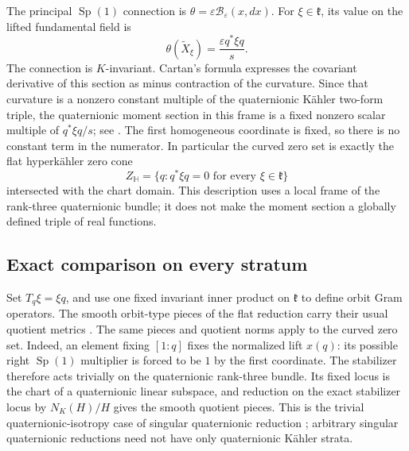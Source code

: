 \documentclass[11pt]{amsart}
\theoremstyle{definition}
\theoremstyle{remark}
\newcommand{\Hh}{\mathbb H}
\newcommand{\kk}{\mathfrak k}
\newcommand{\Sp}{\operatorname{Sp}}
\begin{document}
The principal $\Sp(1)$ connection is
$\theta=\varepsilon\mathcal B_\varepsilon(x,dx)$.
For $\xi\in\kk$, its value on the lifted fundamental field is
\[
 \theta(\widetilde X_\xi)=\frac{\varepsilon q^*\xi q}{s}.
\]
The connection is $K$-invariant. Cartan's formula expresses the
covariant derivative of this section as minus contraction of the
curvature. Since that curvature is a nonzero constant multiple of
the quaternionic Kähler two-form triple, the quaternionic moment
section in this frame is a fixed nonzero scalar multiple of
$q^*\xi q/s$; see \cite[Chapter 3, \S3.2]{Swa90}.
The first homogeneous coordinate is fixed, so there is no constant
term in the numerator. In particular the curved zero set is exactly
the flat hyperkähler zero cone
\begin{equation}\label{eq:qkzero}
 Z_\Hh=\{q:q^*\xi q=0\text{ for every }\xi\in\kk\}
\end{equation}
intersected with the chart domain. This description uses a local
frame of the rank-three quaternionic bundle; it does not make the
moment section a globally defined triple of real functions.

\subsection{Exact comparison on every stratum}
Set $T_q\xi=\xi q$, and use one fixed invariant inner product on
$\kk$ to define orbit Gram operators. The smooth orbit-type pieces
of the flat reduction carry their usual quotient metrics
\cite[Theorem 1.1 and \S2.5]{May22}. The same pieces and quotient
norms apply to the curved zero set. Indeed, an element fixing
$[1:q]$ fixes the normalized lift $x(q)$: its possible right
$\Sp(1)$ multiplier is forced to be $1$ by the first coordinate.
The stabilizer therefore acts trivially on the quaternionic
rank-three bundle. Its fixed locus is the chart of a quaternionic
linear subspace, and reduction on the exact stabilizer locus by
$N_K(H)/H$ gives the smooth quotient pieces. This is the trivial
quaternionic-isotropy case of singular quaternionic reduction
\cite[\S\S3--4]{Swa97}; arbitrary singular quaternionic reductions
need not have only quaternionic Kähler strata.
\end{document}

